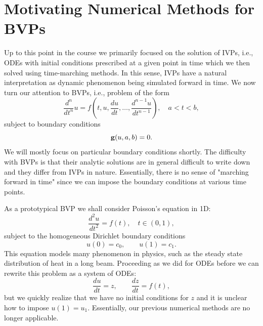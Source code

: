 \chapter{Motivating Numerical Methods for BVPs}

Up to this point in the course we primarily focused on the 
solution of IVPs, i.e., ODEs with initial conditions 
prescribed at a given point in time which we then solved 
using time-marching methods. In this sense, IVPs have a 
natural interpretation as dynamic phenomenon being simulated
forward in time. We now turn our attention to BVPs, i.e., 
problem of the form 
\begin{equation*}
    \frac{d^n}{dt^n} u = f  \left(t, u, \frac{d u }{dt}, 
    \dots, \frac{d^{n-1} u }{dt^{n-1}} \right), \quad a < t < b, 
\end{equation*}
subject to boundary conditions 
\begin{equation*}
   {\mathbf{g}}(u, a, b) = 0.
\end{equation*}
We will mostly focus on particular boundary conditions shortly. 
The difficulty with BVPs is that their analytic solutions 
are in general difficult to write down and they differ from 
IVPs in nature. Essentially, there is no sense of "marching 
forward in time" since we can impose the boundary conditions 
at various time points. 

As a prototypical BVP we shall consider Poisson's equation in 
1D: 
\begin{equation}\label{eq:l15:poisson}
    \frac{d^2 u}{dt^2} = f(t), \quad t \in (0, 1),
\end{equation}
subject to the homogeneous Dirichlet boundary conditions 
\begin{equation*}
    u(0) = c_0, \qquad u(1) = c_1. 
\end{equation*}
This equation models many phenomenon in physics, such as 
the steady state distribution of heat in a long 
beam. Proceeding as we did for ODEs before we can rewrite 
this problem as a system of ODEs:
\begin{equation}
    \frac{d u}{d t} = z, \qquad \frac{d z}{d t} = 
    f(t),
\end{equation}
but we quickly realize that we have no initial conditions for 
$z$ and it is unclear how to impose $u(1) = u_1$. Essentially, 
our previous numerical methods are no longer applicable. 

